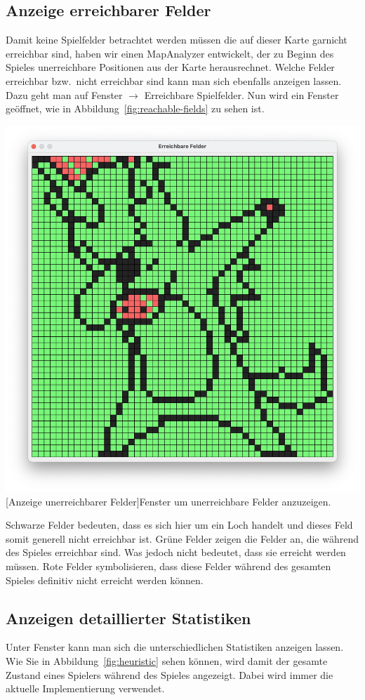 \subsection{Anzeige erreichbarer Felder}\label{subsec:anzeige-erreichbarer-felder}
Damit keine Spielfelder betrachtet werden m\"ussen die auf dieser Karte garnicht erreichbar sind, haben wir einen MapAnalyzer entwickelt, der zu Beginn des Spieles unerreichbare Positionen aus der Karte herausrechnet.
Welche Felder erreichbar bzw.\ nicht erreichbar sind kann man sich ebenfalls anzeigen lassen.
Dazu geht man auf Fenster $\rightarrow$ Erreichbare Spielfelder.
Nun wird ein Fenster ge\"offnet, wie in Abbildung~\ref{fig:reachable-fields} zu sehen ist.

\vspace{1em}
\begin{minipage}{\linewidth}
    \centering
    \includegraphics[width=0.7\linewidth]{pics/reachable-fields}
    [Anzeige unerreichbarer Felder]{Fenster um unerreichbare Felder anzuzeigen.}
    \label{fig:reachable-fields}
\end{minipage}

Schwarze Felder bedeuten, dass es sich hier um ein Loch handelt und dieses Feld somit generell nicht erreichbar ist.
Gr\"une Felder zeigen die Felder an, die w\"ahrend des Spieles erreichbar sind.
Was jedoch nicht bedeutet, dass sie erreicht werden m\"ussen.
Rote Felder symbolisieren, dass diese Felder w\"ahrend des gesamten Spieles definitiv nicht erreicht werden k\"onnen.

\subsection{Anzeigen detaillierter Statistiken}\label{subsec:anzeigen-detaillierter-statistiken}
Unter Fenster kann man sich die unterschiedlichen Statistiken anzeigen lassen.
Wie Sie in Abbildung~\ref{fig:heuristic} sehen k\"onnen, wird damit der gesamte Zustand eines Spielers w\"ahrend des Spieles angezeigt.
Dabei wird immer die aktuelle Implementierung verwendet.

